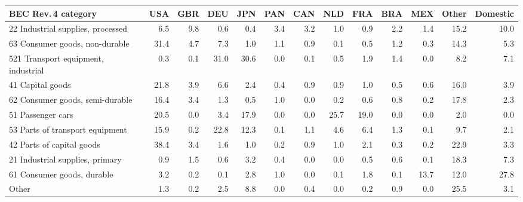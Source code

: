 \begin{tabular}{lrrrrrrrrrrrr}
\toprule
BEC Rev.\,4 category & USA & GBR & DEU & JPN & PAN & CAN & NLD & FRA & BRA & MEX & Other & Domestic \\
\midrule
22 Industrial supplies, processed & 6.5 & 9.8 & 0.6 & 0.4 & 3.4 & 3.2 & 1.0 & 0.9 & 2.2 & 1.4 & 15.2 & 10.0 \\
63 Consumer goods, non-durable & 31.4 & 4.7 & 7.3 & 1.0 & 1.1 & 0.9 & 0.1 & 0.5 & 1.2 & 0.3 & 14.3 & 5.3 \\
521 Transport equipment, industrial & 0.3 & 0.1 & 31.0 & 30.6 & 0.0 & 0.1 & 0.5 & 1.9 & 1.4 & 0.0 & 8.2 & 7.1 \\
41 Capital goods & 21.8 & 3.9 & 6.6 & 2.4 & 0.4 & 0.9 & 0.9 & 1.0 & 0.5 & 0.6 & 16.0 & 3.9 \\
62 Consumer goods, semi-durable & 16.4 & 3.4 & 1.3 & 0.5 & 1.0 & 0.0 & 0.2 & 0.6 & 0.8 & 0.2 & 17.8 & 2.3 \\
51 Passenger cars & 20.5 & 0.0 & 3.4 & 17.9 & 0.0 & 0.0 & 25.7 & 19.0 & 0.0 & 0.0 & 2.0 & 0.0 \\
53 Parts of transport equipment & 15.9 & 0.2 & 22.8 & 12.3 & 0.1 & 1.1 & 4.6 & 6.4 & 1.3 & 0.1 & 9.7 & 2.1 \\
42 Parts of capital goods & 38.4 & 3.4 & 1.6 & 1.0 & 0.2 & 0.9 & 1.0 & 2.1 & 0.3 & 0.2 & 22.9 & 3.3 \\
21 Industrial supplies, primary & 0.9 & 1.5 & 0.6 & 3.2 & 0.4 & 0.0 & 0.0 & 0.5 & 0.6 & 0.1 & 18.3 & 7.3 \\
61 Consumer goods, durable & 3.2 & 0.2 & 0.1 & 2.8 & 1.0 & 0.0 & 0.1 & 1.8 & 0.1 & 13.7 & 12.0 & 27.8 \\
Other & 1.3 & 0.2 & 2.5 & 8.8 & 0.0 & 0.4 & 0.0 & 0.2 & 0.9 & 0.0 & 25.5 & 3.1 \\
\bottomrule
\end{tabular}
